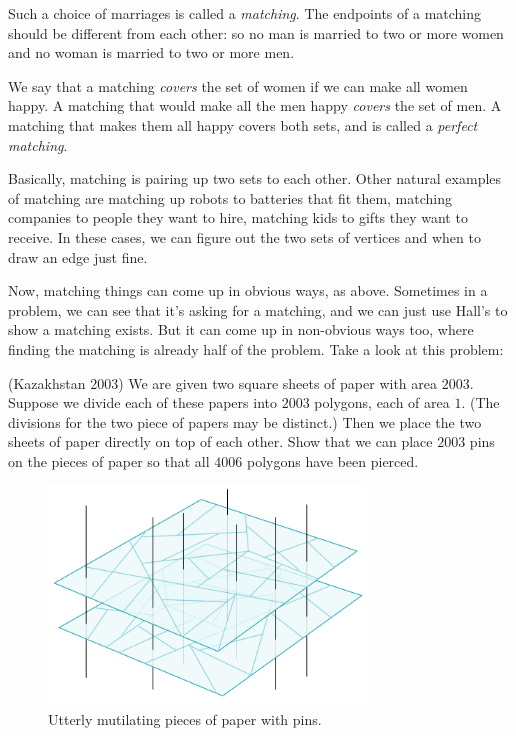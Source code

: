 \documentclass[11pt,paper=letter]{scrartcl}
\begin{document}
Such a choice of marriages is called a \emph{matching}. The endpoints of a matching should be different from each other: so no man is married to two or more women and no woman is married to two or more men.

We say that a matching \emph{covers} the set of women if we can make all women happy. A matching that would make all the men happy \emph{covers} the set of men. A matching that makes them all happy covers both sets, and is called a \emph{perfect matching}.

Basically, matching is pairing up two sets to each other. Other natural examples of matching are matching up robots to batteries that fit them, matching companies to people they want to hire, matching kids to gifts they want to receive. In these cases, we can figure out the two sets of vertices and when to draw an edge just fine.

Now, matching things can come up in obvious ways, as above. Sometimes in a problem, we can see that it's asking for a matching, and we can just use Hall's to show a matching exists. But it can come up in non-obvious ways too, where finding the matching is already half of the problem. Take a look at this problem:

\begin{problem*}
  (Kazakhstan 2003) We are given two square sheets of paper with area $2003$. Suppose we divide each of these papers into $2003$ polygons, each of area $1$. (The divisions for the two piece of papers may be distinct.) Then we place the two sheets of paper directly on top of each other. Show that we can place $2003$ pins on the pieces of paper so that all $4006$ polygons have been pierced.
\end{problem*}

\begin{figure}
  \centering
  \includegraphics[width=0.75\textwidth]{figure2.png}
  \caption{Utterly mutilating pieces of paper with pins.}
\end{figure}
\end{document}
